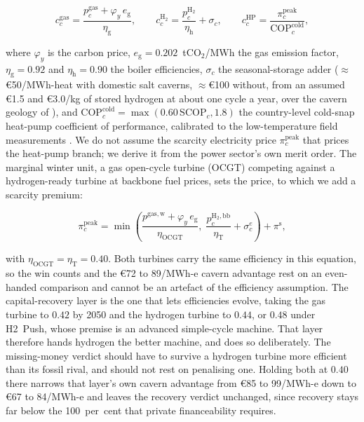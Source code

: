 \begin{equation}
\label{eq:srmc}
 c^{\mathrm{gas}}_{c}
 = \frac{p^{\mathrm{gas}}_{c} + \varphi_{y}\, e_{\mathrm{g}}}{\eta_{\mathrm{g}}},
 \qquad
 c^{\mathrm{H_2}}_{c}
 = \frac{p^{\mathrm{H_2}}_{c}}{\eta_{\mathrm{h}}} + \sigma_{c},
 \qquad
 c^{\mathrm{HP}}_{c}
 = \frac{\pi^{\mathrm{peak}}_{c}}{\mathrm{COP}^{\mathrm{cold}}_{c}},
\end{equation}

\noindent where $\varphi_{y}$ is the carbon price, $e_{\mathrm{g}}=0.202$~tCO$_2$/MWh
the gas emission factor, $\eta_{\mathrm{g}}{=}0.92$ and $\eta_{\mathrm{h}}{=}0.90$
the boiler efficiencies, $\sigma_{c}$ the seasonal-storage adder
($\approx$\euro{}50/MWh-heat with domestic salt caverns, $\approx$\euro{}100 without, from an
assumed \euro{}1.5 and \euro{}3.0/kg of stored hydrogen at about one cycle a year, over the
cavern geology of \citealp{Caglayan2020caverns}), and
$\mathrm{COP}^{\mathrm{cold}}_{c}=\max(0.60\,\mathrm{SCOP}_{c},1.8)$ the country-level
cold-snap heat-pump coefficient of performance, calibrated to the low-temperature field
measurements \citep{Gibb2023Coming}. We do not assume the scarcity electricity price
$\pi^{\mathrm{peak}}_{c}$ that prices the heat-pump branch; we derive it from the
power sector's own merit order. The marginal winter unit, a gas open-cycle turbine
(OCGT) competing against a hydrogen-ready turbine at backbone fuel prices, sets the
price, to which we add a scarcity premium:

\begin{equation}
\label{eq:peakprice}
 \pi^{\mathrm{peak}}_{c}
 = \min\!\left(
 \frac{p^{\mathrm{gas,w}} + \varphi_{y}\, e_{\mathrm{g}}}{\eta_{\mathrm{OCGT}}},\;
 \frac{p^{\mathrm{H_2,bb}}_{c}}{\eta_{\mathrm{T}}} + \sigma^{e}_{c}
 \right) + \pi^{\mathrm{s}},
\end{equation}

\noindent with $\eta_{\mathrm{OCGT}}=\eta_{\mathrm{T}}=0.40$. Both turbines carry the same efficiency
in this equation, so the win counts and the \euro{}72 to 89/MWh-e cavern advantage rest on an even-handed
comparison and cannot be an artefact of the efficiency assumption. The capital-recovery layer is the one
that lets efficiencies evolve, taking the gas turbine to $0.42$ by 2050 and the hydrogen turbine to $0.44$,
or $0.48$ under H2~Push, whose premise is an advanced simple-cycle machine. That layer therefore hands
hydrogen the better machine, and does so deliberately. The missing-money verdict should have to
survive a hydrogen turbine more efficient than its fossil rival, and should not rest on penalising one. Holding both at $0.40$
there narrows that layer's own cavern advantage from \euro{}85 to 99/MWh-e down to \euro{}67 to 84/MWh-e and leaves the
recovery verdict unchanged, since recovery stays far below the 100~per~cent that private
financeability requires.

